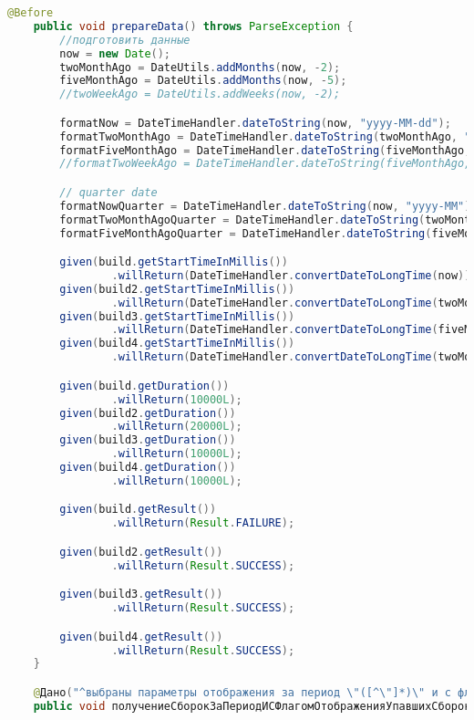 \begin{lstlisting}[language=Java]
    @Before
    public void prepareData() throws ParseException {
        //подготовить данные
        now = new Date();
        twoMonthAgo = DateUtils.addMonths(now, -2);
        fiveMonthAgo = DateUtils.addMonths(now, -5);
        //twoWeekAgo = DateUtils.addWeeks(now, -2);

        formatNow = DateTimeHandler.dateToString(now, "yyyy-MM-dd");
        formatTwoMonthAgo = DateTimeHandler.dateToString(twoMonthAgo, "yyyy-MM-dd");
        formatFiveMonthAgo = DateTimeHandler.dateToString(fiveMonthAgo, "yyyy-MM-dd");
        //formatTwoWeekAgo = DateTimeHandler.dateToString(fiveMonthAgo, "yyyy-MM-dd");

        // quarter date
        formatNowQuarter = DateTimeHandler.dateToString(now, "yyyy-MM");
        formatTwoMonthAgoQuarter = DateTimeHandler.dateToString(twoMonthAgo, "yyyy-MM");
        formatFiveMonthAgoQuarter = DateTimeHandler.dateToString(fiveMonthAgo, "yyyy-MM");

        given(build.getStartTimeInMillis())
                .willReturn(DateTimeHandler.convertDateToLongTime(now));
        given(build2.getStartTimeInMillis())
                .willReturn(DateTimeHandler.convertDateToLongTime(twoMonthAgo));
        given(build3.getStartTimeInMillis())
                .willReturn(DateTimeHandler.convertDateToLongTime(fiveMonthAgo));
        given(build4.getStartTimeInMillis())
                .willReturn(DateTimeHandler.convertDateToLongTime(twoMonthAgo));

        given(build.getDuration())
                .willReturn(10000L);
        given(build2.getDuration())
                .willReturn(20000L);
        given(build3.getDuration())
                .willReturn(10000L);
        given(build4.getDuration())
                .willReturn(10000L);

        given(build.getResult())
                .willReturn(Result.FAILURE);

        given(build2.getResult())
                .willReturn(Result.SUCCESS);

        given(build3.getResult())
                .willReturn(Result.SUCCESS);

        given(build4.getResult())
                .willReturn(Result.SUCCESS);
    }

    @Дано("^выбраны параметры отображения за период \"([^\"]*)\" и с флагом отображения упавших сборок \"([^\"]*)\"$")
    public void получениеСборокЗаПериодИСФлагомОтображенияУпавшихСборок(IntervalDate period, Boolean failed) throws Throwable {


\end{lstlisting}
